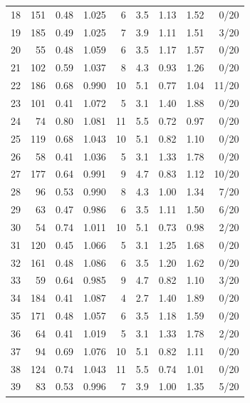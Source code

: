 \begin{table}[!htbp]
\begin{tabular}{@{}rrrrrrrrr@{}}
18 & 151 & 0.48 & 1.025 & 6 & 3.5 & 1.13 & 1.52 & 0/20 \\
19 & 185 & 0.49 & 1.025 & 7 & 3.9 & 1.11 & 1.51 & 3/20 \\
20 & 55 & 0.48 & 1.059 & 6 & 3.5 & 1.17 & 1.57 & 0/20 \\
21 & 102 & 0.59 & 1.037 & 8 & 4.3 & 0.93 & 1.26 & 0/20 \\
22 & 186 & 0.68 & 0.990 & 10 & 5.1 & 0.77 & 1.04 & 11/20 \\
23 & 101 & 0.41 & 1.072 & 5 & 3.1 & 1.40 & 1.88 & 0/20 \\
24 & 74 & 0.80 & 1.081 & 11 & 5.5 & 0.72 & 0.97 & 0/20 \\
25 & 119 & 0.68 & 1.043 & 10 & 5.1 & 0.82 & 1.10 & 0/20 \\
26 & 58 & 0.41 & 1.036 & 5 & 3.1 & 1.33 & 1.78 & 0/20 \\
27 & 177 & 0.64 & 0.991 & 9 & 4.7 & 0.83 & 1.12 & 10/20 \\
28 & 96 & 0.53 & 0.990 & 8 & 4.3 & 1.00 & 1.34 & 7/20 \\
29 & 63 & 0.47 & 0.986 & 6 & 3.5 & 1.11 & 1.50 & 6/20 \\
30 & 54 & 0.74 & 1.011 & 10 & 5.1 & 0.73 & 0.98 & 2/20 \\
31 & 120 & 0.45 & 1.066 & 5 & 3.1 & 1.25 & 1.68 & 0/20 \\
32 & 161 & 0.48 & 1.086 & 6 & 3.5 & 1.20 & 1.62 & 0/20 \\
33 & 59 & 0.64 & 0.985 & 9 & 4.7 & 0.82 & 1.10 & 3/20 \\
34 & 184 & 0.41 & 1.087 & 4 & 2.7 & 1.40 & 1.89 & 0/20 \\
35 & 171 & 0.48 & 1.057 & 6 & 3.5 & 1.18 & 1.59 & 0/20 \\
36 & 64 & 0.41 & 1.019 & 5 & 3.1 & 1.33 & 1.78 & 2/20 \\
37 & 94 & 0.69 & 1.076 & 10 & 5.1 & 0.82 & 1.11 & 0/20 \\
38 & 124 & 0.74 & 1.043 & 11 & 5.5 & 0.74 & 1.01 & 0/20 \\
39 & 83 & 0.53 & 0.996 & 7 & 3.9 & 1.00 & 1.35 & 5/20 \\
\bottomrule\end{tabular}\end{table}